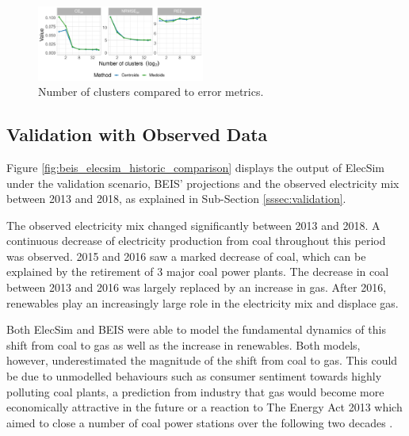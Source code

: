 \begin{figure}
	\centering
	\includegraphics[width=0.49\textwidth]{Chapter4/figures/e-Energy-2020/methods_and_materials/clusters_compared_ggplot.pdf}
	\caption{Number of clusters compared to error metrics.}
	\label{fig:error_metrics_vs_cluster_number}
\end{figure}



\subsection{Validation with Observed Data}

Figure \ref{fig:beis_elecsim_historic_comparison} displays the output of ElecSim under the validation scenario, BEIS' projections and the observed electricity mix between 2013 and 2018, as explained in Sub-Section \ref{sssec:validation}.

The observed electricity mix changed significantly between 2013 and 2018. A continuous decrease of electricity production from coal throughout this period was observed. 2015 and 2016 saw a marked decrease of coal, which can be explained by the retirement of 3 major coal power plants. The decrease in coal between 2013 and 2016 was largely replaced by an increase in gas. After 2016, renewables play an increasingly large role in the electricity mix and displace gas.

Both ElecSim and BEIS were able to model the fundamental dynamics of this shift from coal to gas as well as the increase in renewables. Both models, however, underestimated the magnitude of the shift from coal to gas. This could be due to unmodelled behaviours such as consumer sentiment towards highly polluting coal plants, a prediction from industry that gas would become more economically attractive in the future or a reaction to The Energy Act 2013 which aimed to close a number of coal power stations over the following two decades \cite{uk_energy_act}.


